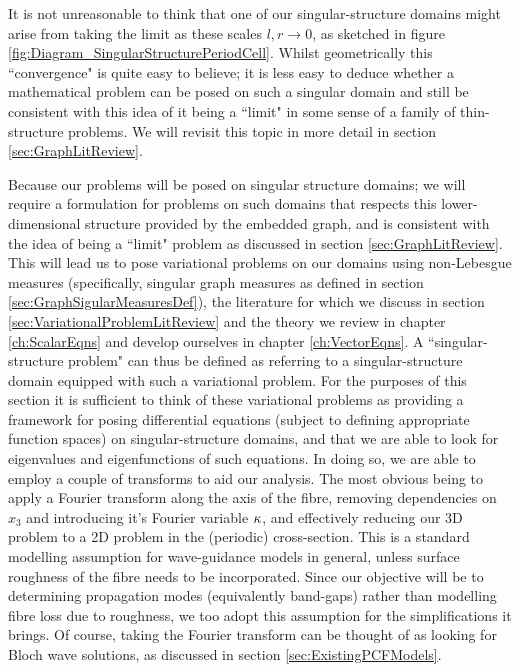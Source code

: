 It is not unreasonable to think that one of our singular-structure domains might arise from taking the limit as these scales $l,r\rightarrow0$, as sketched in figure \ref{fig:Diagram_SingularStructurePeriodCell}.
Whilst geometrically this ``convergence" is quite easy to believe; it is less easy to deduce whether a mathematical problem can be posed on such a singular domain and still be consistent with this idea of it being a ``limit" in some sense of a family of thin-structure problems.
We will revisit this topic in more detail in section \ref{sec:GraphLitReview}. \newline

Because our problems will be posed on singular structure domains; we will require a formulation for problems on such domains that respects this lower-dimensional structure provided by the embedded graph, and is consistent with the idea of being a ``limit" problem as discussed in section \ref{sec:GraphLitReview}.
This will lead us to pose variational problems on our domains using non-Lebesgue measures (specifically, singular graph measures as defined in section \ref{sec:GraphSigularMeasuresDef}), the literature for which we discuss in section \ref{sec:VariationalProblemLitReview} and the theory we review in chapter \ref{ch:ScalarEqns} and develop ourselves in chapter \ref{ch:VectorEqns}.
A ``singular-structure problem" can thus be defined as referring to a singular-structure domain equipped with such a variational problem.
For the purposes of this section it is sufficient to think of these variational problems as providing a framework for posing differential equations (subject to defining appropriate function spaces) on singular-structure domains, and that we are able to look for eigenvalues and eigenfunctions of such equations.
In doing so, we are able to employ a couple of transforms to aid our analysis.
The most obvious being to apply a Fourier transform along the axis of the fibre, removing dependencies on $x_3$ and introducing it's Fourier variable $\kappa$, and effectively reducing our 3D problem to a 2D problem in the (periodic) cross-section.
This is a standard modelling assumption for wave-guidance models in general, unless surface roughness of the fibre needs to be incorporated.
Since our objective will be to determining propagation modes (equivalently band-gaps) rather than modelling fibre loss due to roughness, we too adopt this assumption for the simplifications it brings.
Of course, taking the Fourier transform can be thought of as looking for Bloch wave solutions, as discussed in section \ref{sec:ExistingPCFModels}. \newline

